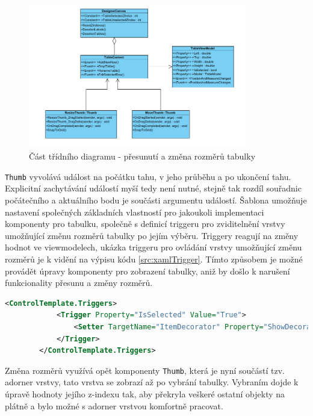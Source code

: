 \documentclass[czech,bachelor,public,dept460,male,oneside]{diploma}
\begin{document}
		\begin{figure}[H]
			\centering
			\includegraphics[width=0.85\textwidth]{Figures/EditorTabulky2}
			\caption{Část třídního diagramu - přesunutí a změna rozměrů tabulky}
			\label{fig:classDiagResize}
		\end{figure}
		
		 \texttt{Thumb} vyvolává událost na počátku tahu, v jeho průběhu a po ukončení tahu. Explicitní zachytávání událostí myší tedy není nutné, stejně tak rozdíl souřadnic počátečního a aktuálního bodu je součásti argumentu událostí. Šablona umožňuje nastavení společných základních vlastností pro jakoukoli implementaci komponenty pro tabulku, společně s definicí triggeru pro zviditelnění vrstvy umožňující změnu rozměrů tabulky po jejím výběru. Triggery reagují na změny hodnot ve viewmodelech, ukázka triggeru pro ovládání vrstvy umožňující změnu rozměrů je k vidění na výpisu kódu \ref{src:xamlTrigger}. Tímto způsobem je možné provádět úpravy komponenty pro zobrazení tabulky, aniž by došlo k narušení funkcionality přesunu a změny rozměrů. 
		
		\begin{lstlisting}[language=xml,label=src:xamlTrigger,caption=Příklad triggeru v XAML pro vrstvu umožňující změnu rozměrů]
		<ControlTemplate.Triggers>
			<Trigger Property="IsSelected" Value="True">
				<Setter TargetName="ItemDecorator" Property="ShowDecorator" Value="True"/>
			</Trigger>
		</ControlTemplate.Triggers>
		\end{lstlisting}
		
		Změna rozměrů využívá opět komponenty \texttt{Thumb}, která je nyní součástí tzv. adorner vrstvy, tato vrstva se zobrazí až po vybrání tabulky. Vybraním dojde k úpravě hodnoty jejího z-indexu tak, aby překryla veškeré ostatní objekty na plátně a bylo možné s adorner vrstvou komfortně pracovat. 
		
\end{document}
